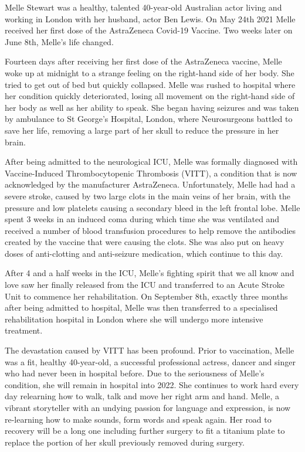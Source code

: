 Melle Stewart was a healthy, talented 40-year-old Australian actor living and
working in London with her husband, actor Ben Lewis. On May 24th 2021 Melle
received her first dose of the AstraZeneca Covid-19 Vaccine. Two weeks later on
June 8th, Melle’s life changed.

Fourteen days after receiving her first dose of the AstraZeneca vaccine, Melle
woke up at midnight to a strange feeling on the right-hand side of her body. She
tried to get out of bed but quickly collapsed. Melle was rushed to hospital
where her condition quickly deteriorated, losing all movement on the right-hand
side of her body as well as her ability to speak. She began having seizures and
was taken by ambulance to St George’s Hospital, London, where Neurosurgeons
battled to save her life, removing a large part of her skull to reduce the
pressure in her brain.

After being admitted to the neurological ICU, Melle was formally diagnosed with
Vaccine-Induced Thrombocytopenic Thrombosis (VITT), a condition that is now
acknowledged by the manufacturer AstraZeneca. Unfortunately, Melle had had a
severe stroke, caused by two large clots in the main veins of her brain, with
the pressure and low platelets causing a secondary bleed in the left frontal
lobe. Melle spent 3 weeks in an induced coma during which time she was
ventilated and received a number of blood transfusion procedures to help remove
the antibodies created by the vaccine that were causing the clots. She was also
put on heavy doses of anti-clotting and anti-seizure medication, which continue
to this day.

After 4 and a half weeks in the ICU, Melle’s fighting spirit that we all know
and love saw her finally released from the ICU and transferred to an Acute
Stroke Unit to commence her rehabilitation. On September 8th, exactly three
months after being admitted to hospital, Melle was then transferred to a
specialised rehabilitation hospital in London where she will undergo more
intensive treatment.

The devastation caused by VITT has been profound. Prior to vaccination, Melle
was a fit, healthy 40-year-old, a successful professional actress, dancer and
singer who had never been in hospital before. Due to the seriousness of Melle’s
condition, she will remain in hospital into 2022. She continues to work hard
every day relearning how to walk, talk and move her right arm and hand. Melle, a
vibrant storyteller with an undying passion for language and expression, is now
re-learning how to make sounds, form words and speak again. Her road to recovery
will be a long one including further surgery to fit a titanium plate to replace
the portion of her skull previously removed during surgery.

